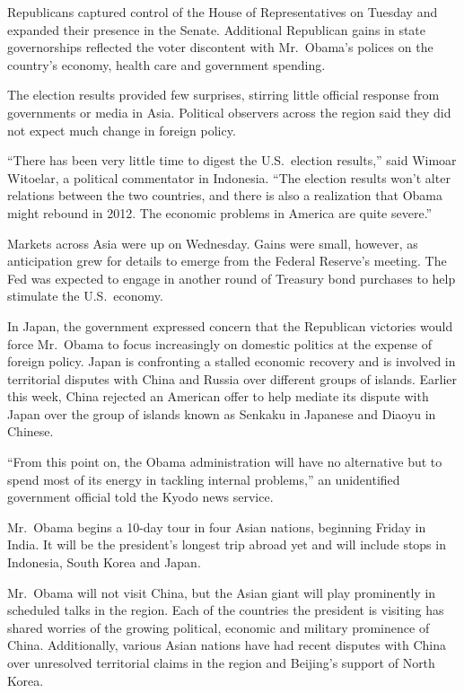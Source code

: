 ﻿\documentclass[12pt]{article}
\begin{document}
Republicans captured control of the House of Representatives on Tuesday and expanded their presence
in the Senate. Additional Republican gains in state governorships reflected the voter discontent
with Mr.~Obama's polices on the country's economy, health care and government spending.

The election results provided few surprises, stirring little official response from governments or
media in Asia. Political observers across the region said they did not expect much change in foreign
policy.

``There has been very little time to digest the U.S.~election results,'' said Wimoar Witoelar, a
political commentator in Indonesia. ``The election results won't alter relations between the two
countries, and there is also a realization that Obama might rebound in 2012. The economic problems
in America are quite severe.''

Markets across Asia were up on Wednesday. Gains were small, however, as anticipation grew for
details to emerge from the Federal Reserve's meeting. The Fed was expected to engage in another
round of Treasury bond purchases to help stimulate the U.S.~economy.

In Japan, the government expressed concern that the Republican victories would force Mr.~Obama to
focus increasingly on domestic politics at the expense of foreign policy. Japan is confronting a
stalled economic recovery and is involved in territorial disputes with China and Russia over
different groups of islands. Earlier this week, China rejected an American offer to help mediate its
dispute with Japan over the group of islands known as Senkaku in Japanese and Diaoyu in Chinese.

``From this point on, the Obama administration will have no alternative but to spend most of its
energy in tackling internal problems,'' an unidentified government official told the Kyodo news
service.

Mr.~Obama begins a 10-day tour in four Asian nations, beginning Friday in India. It will be the
president's longest trip abroad yet and will include stops in Indonesia, South Korea and Japan.

Mr.~Obama will not visit China, but the Asian giant will play prominently in scheduled talks in the
region. Each of the countries the president is visiting has shared worries of the growing political,
economic and military prominence of China. Additionally, various Asian nations have had recent
disputes with China over unresolved territorial claims in the region and Beijing's support of North
Korea.
\end{document}
